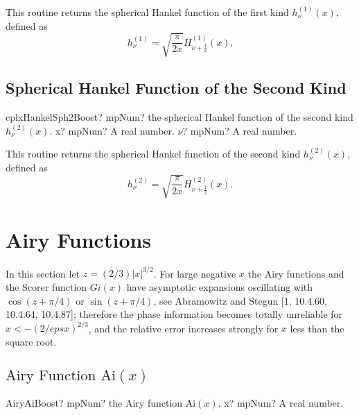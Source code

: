 \vspace{0.3cm}
This routine returns the spherical Hankel function of the first kind $h_{\nu}^{(1)}(x)$, defined as
\begin{equation}
	h_{\nu}^{(1)} = \sqrt{\frac{\pi}{2x}} H_{\nu+\tfrac{1}{2}}^{(1)}(x).
\end{equation}


\subsection{Spherical Hankel Function of the Second Kind}

\begin{mpFunctionsExtract}
	\mpFunctionTwo
	{cplxHankelSph2Boost? mpNum? the spherical Hankel function of the second kind $h_{\nu}^{(2)}(x)$.}
	{x? mpNum? A real number.}
	{$\nu$? mpNum? A real number.}
\end{mpFunctionsExtract}

\vspace{0.3cm}
This routine returns the spherical Hankel function of the second kind $h_{\nu}^{(2)}(x)$, defined as
\begin{equation}
	h_{\nu}^{(2)} = \sqrt{\frac{\pi}{2x}} H_{\nu+\tfrac{1}{2}}^{(2)}(x).
\end{equation}









\section{Airy Functions}
\label{AiryFunctionsBoost}


In this section let $z = (2/3)|x|^{3/2}$.  For large negative $x$ the Airy functions and the Scorer function $Gi(x)$ have asymptotic expansions oscillating with $\cos(z + \pi/4)$ or $\sin(z + \pi/4)$, see Abramowitz and Stegun [1, 10.4.60, 10.4.64, 10.4.87]; therefore the phase information becomes totally unreliable for $x < −(2/eps x)^{2/3}$, and
the relative error increases strongly for $x$ less than the square root.

\subsection{\texorpdfstring{$\text{Airy Function Ai}(x)$}{Aix}}

\begin{mpFunctionsExtract}
	\mpFunctionOne
	{AiryAiBoost? mpNum? the Airy function $\text{Ai}(x)$.}
	{x? mpNum? A real number.}
\end{mpFunctionsExtract}

